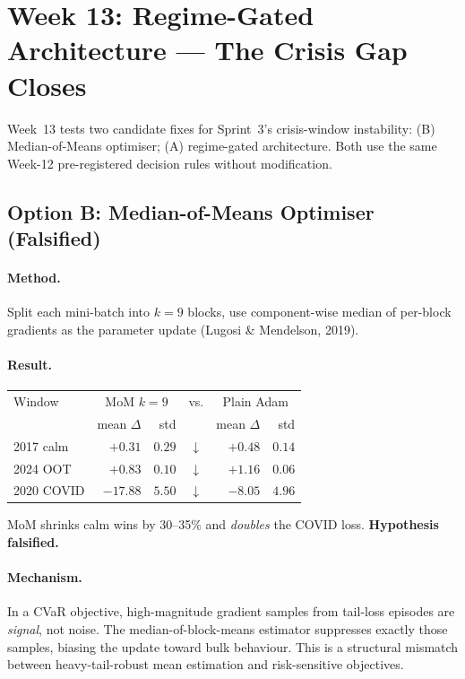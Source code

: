\documentclass[11pt, a4paper]{article}
\begin{document}
\section{Week 13: Regime-Gated Architecture --- The Crisis Gap Closes}
\label{sec:week13}

Week~13 tests two candidate fixes for Sprint~3's crisis-window instability:
(B) Median-of-Means optimiser; (A) regime-gated architecture.
Both use the same Week-12 pre-registered decision rules without modification.

\subsection{Option B: Median-of-Means Optimiser (Falsified)}

\paragraph{Method.} Split each mini-batch into $k=9$ blocks, use
component-wise median of per-block gradients as the parameter update
(Lugosi \& Mendelson, 2019).

\paragraph{Result.}
\begin{center}
\footnotesize
\begin{tabular}{lrrcrr}
\toprule
Window & \multicolumn{2}{c}{MoM $k=9$} & vs. & \multicolumn{2}{c}{Plain Adam} \\
       & mean $\Delta$ & std & & mean $\Delta$ & std \\
\midrule
2017 calm  & $+0.31$ & $0.29$ & $\downarrow$ & $+0.48$ & $0.14$ \\
2024 OOT   & $+0.83$ & $0.10$ & $\downarrow$ & $+1.16$ & $0.06$ \\
2020 COVID & $-17.88$ & $5.50$ & $\downarrow$ & $-8.05$ & $4.96$ \\
\bottomrule
\end{tabular}
\end{center}

MoM shrinks calm wins by 30--35\% and \emph{doubles} the COVID loss.
\textbf{Hypothesis falsified.}

\paragraph{Mechanism.} In a CVaR objective, high-magnitude gradient
samples from tail-loss episodes are \emph{signal}, not noise. The
median-of-block-means estimator suppresses exactly those samples,
biasing the update toward bulk behaviour. This is a structural mismatch
between heavy-tail-robust mean estimation and risk-sensitive objectives.
\end{document}
